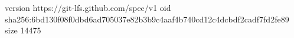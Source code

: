 version https://git-lfs.github.com/spec/v1
oid sha256:6bd130f08f0dbd6ad705037e82b3b9c4aaf4b740cd12c4dcbdf2cadf7fd2fe89
size 14475
